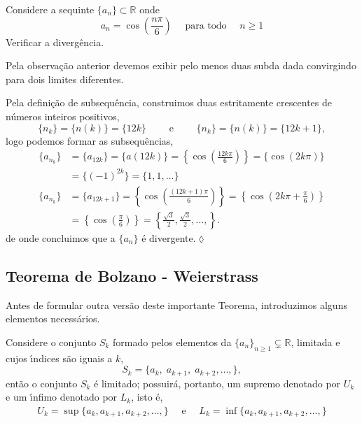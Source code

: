 \begin{exer}
Considere a sequinte \seq $\{a_n\}\subset \mathbb{R}$ onde
\begin{equation*}
    a_n=\cos\left(\frac{n\pi}{6} \right)\quad \text{ para todo }\quad n\geq 1
\end{equation*}
Verificar a diverg\^{e}ncia.
\end{exer}

\solo Pela observa\c{c}\~{a}o anterior devemos exibir pelo menos duas
sub\seqs da \seq dada convirgindo para dois limites diferentes.

Pela defini\c{c}\~{a}o de subsequ\^{e}ncia, construimos duas \seqs estritamente
crescentes de n\'{u}meros inteiros positivos,
\begin{equation*}
    \{n_k \}=\{n(k)\}=\{12k\}\qquad\text{ e }\qquad \{n_k \}=\{n(k)\}=\{12k+1\},
\end{equation*}
logo podemos formar as subsequ\^{e}ncias,
\begin{align*}
    \{a_{n_k} \}&=\{a_{12k}\}=\{a(12k)\}=\left\{\cos\left(\frac{12k\pi}{6} \right) \right\}= \{\cos\left(
    2k\pi\right)\}\\[2ex]
    &=\{(-1)^{2k}\}=\{1,1,\ldots \}\\[2ex]
    \{a_{n_k} \}&=\{a_{12k+1}\}=\left\{ \cos\left(\frac{(12k+1)\pi}{6} \right) \right\}= \left\{\cos\left(
    2k\pi+\frac{\pi}{6}\right)\right\}\\[2ex]
    &=\left\{\cos\left(\frac{\pi}{6}\right)\right\}=\left\{\frac{\sqrt{3}}{2},
    \frac{\sqrt{3}}{2},\ldots,\right\}.
\end{align*}
de onde concluimos que a \seq $\{a_n\}$ \'{e} divergente.\hfill \(\lozenge\)

\subsection{Teorema de Bolzano - Weierstrass}
Antes de formular outra vers\~{a}o deste importante Teorema, introduzimos alguns elementos necess\'{a}rios.

Considere o conjunto $S_k$ formado pelos elementos da \seq $\{a_n\}_{n \geq 1}\subsetneq \mathbb{R}$, limitada e cujos \'{\i}ndices s\~{a}o iguais a $k$,
\begin{equation*}
    S_k=\{a_k,\; a_{k+1},\; a_{k+2},\ldots, \},
\end{equation*}
ent\~{a}o o conjunto $S_k$ \'{e} limitado; possuir\'{a}, portanto, um supremo denotado por $U_k$ e um \'{\i}nfimo denotado por $L_k$, isto \'{e},
\begin{align*}
    U_k=\sup\{a_k, a_{k+1}, a_{k+2},\ldots,  \}\quad \text{ e }\quad
    L_k=\inf\{a_k, a_{k+1}, a_{k+2},\ldots,  \}
\end{align*}

